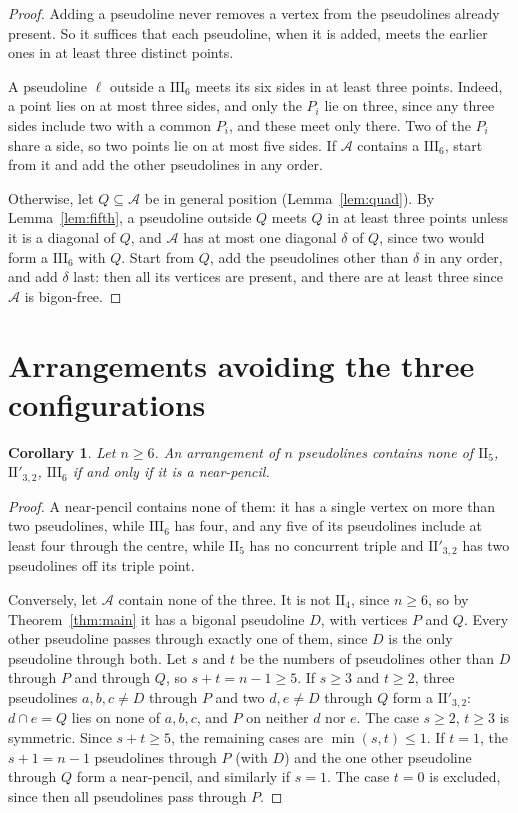 \documentclass[11pt,a4paper]{amsart}
\newtheorem{corollary}[theorem]{Corollary}
\theoremstyle{definition}
\theoremstyle{remark}
\newcommand{\II}[1]{\mathrm{II}_{#1}}
\newcommand{\IIp}{\mathrm{II}'_{3,2}}
\newcommand{\III}{\mathrm{III}_{6}}
\newcommand{\A}{\mathcal A}
\begin{document}
\begin{proof}
Adding a pseudoline never removes a vertex from the pseudolines already present. So it suffices that each pseudoline, when it is added, meets the earlier ones in at least three distinct points.

A pseudoline $\ell$ outside a $\III$ meets its six sides in at least three points. Indeed, a point lies on at most three sides, and only the $P_i$ lie on three, since any three sides include two with a common $P_i$, and these meet only there. Two of the $P_i$ share a side, so two points lie on at most five sides. If $\A$ contains a $\III$, start from it and add the other pseudolines in any order.

Otherwise, let $Q \subseteq \A$ be in general position (Lemma~\ref{lem:quad}). By Lemma~\ref{lem:fifth}, a pseudoline outside $Q$ meets $Q$ in at least three points unless it is a diagonal of $Q$, and $\A$ has at most one diagonal $\delta$ of $Q$, since two would form a $\III$ with $Q$. Start from $Q$, add the pseudolines other than $\delta$ in any order, and add $\delta$ last: then all its vertices are present, and there are at least three since $\A$ is bigon-free.
\end{proof}

\section{Arrangements avoiding the three configurations}

\begin{corollary}\label{cor:near}
Let $n \ge 6$. An arrangement of $n$ pseudolines contains none of $\II5$, $\IIp$, $\III$ if and only if it is a near-pencil.
\end{corollary}

\begin{proof}
A near-pencil contains none of them: it has a single vertex on more than two pseudolines, while $\III$ has four, and any five of its pseudolines include at least four through the centre, while $\II5$ has no concurrent triple and $\IIp$ has two pseudolines off its triple point.

Conversely, let $\A$ contain none of the three. It is not $\II4$, since $n \ge 6$, so by Theorem~\ref{thm:main} it has a bigonal pseudoline $D$, with vertices $P$ and $Q$. Every other pseudoline passes through exactly one of them, since $D$ is the only pseudoline through both. Let $s$ and $t$ be the numbers of pseudolines other than $D$ through $P$ and through $Q$, so $s + t = n - 1 \ge 5$. If $s \ge 3$ and $t \ge 2$, three pseudolines $a, b, c \ne D$ through $P$ and two $d, e \ne D$ through $Q$ form a $\IIp$: $d \cap e = Q$ lies on none of $a, b, c$, and $P$ on neither $d$ nor $e$. The case $s \ge 2$, $t \ge 3$ is symmetric. Since $s + t \ge 5$, the remaining cases are $\min(s, t) \le 1$. If $t = 1$, the $s + 1 = n - 1$ pseudolines through $P$ (with $D$) and the one other pseudoline through $Q$ form a near-pencil, and similarly if $s = 1$. The case $t = 0$ is excluded, since then all pseudolines pass through $P$.
\end{proof}
\end{document}
